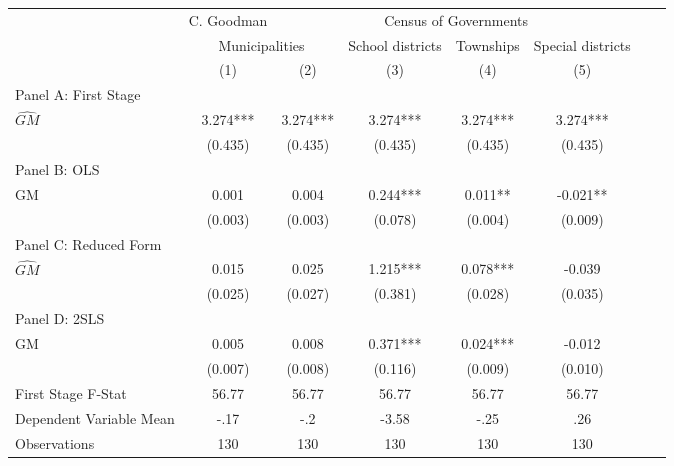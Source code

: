  \begin{tabular}{l*{7}{c}} \toprule
&\multicolumn{1}{c}{C. Goodman}&\multicolumn{4}{c}{Census of Governments}\\\cmidrule(lr){2-2}\cmidrule(lr){3-6}
&\multicolumn{2}{c}{Municipalities}&\multicolumn{1}{c}{School districts}&\multicolumn{1}{c}{Townships}&\multicolumn{1}{c}{Special districts}\\\cmidrule(lr){2-3}\cmidrule(lr){4-6}
&\multicolumn{1}{c}{(1)}&\multicolumn{1}{c}{(2)}&\multicolumn{1}{c}{(3)}&\multicolumn{1}{c}{(4)}&\multicolumn{1}{c}{(5)}\\
\cmidrule(lr){1-6}
\multicolumn{5}{l}{Panel A: First Stage}\\
\cmidrule(lr){1-6}
$\widehat{GM}$  &    3.274***&    3.274***&    3.274***&    3.274***&    3.274***\\
                &  (0.435)   &  (0.435)   &  (0.435)   &  (0.435)   &  (0.435)   \\
\cmidrule(lr){1-6}
\multicolumn{5}{l}{Panel B: OLS}\\
\cmidrule(lr){1-6}
GM              &    0.001   &    0.004   &    0.244***&    0.011** &   -0.021** \\
                &  (0.003)   &  (0.003)   &  (0.078)   &  (0.004)   &  (0.009)   \\
\cmidrule(lr){1-6}
\multicolumn{5}{l}{Panel C: Reduced Form}\\
\cmidrule(lr){1-6}
$\widehat{GM}$  &    0.015   &    0.025   &    1.215***&    0.078***&   -0.039   \\
                &  (0.025)   &  (0.027)   &  (0.381)   &  (0.028)   &  (0.035)   \\
\cmidrule(lr){1-6}
\multicolumn{5}{l}{Panel D: 2SLS}\\
\cmidrule(lr){1-6}
GM              &    0.005   &    0.008   &    0.371***&    0.024***&   -0.012   \\
                &  (0.007)   &  (0.008)   &  (0.116)   &  (0.009)   &  (0.010)   \\
\midrule
First Stage F-Stat&    56.77   &    56.77   &    56.77   &    56.77   &    56.77   \\
Dependent Variable Mean&     -.17   &      -.2   &    -3.58   &     -.25   &      .26   \\
Observations    &      130   &      130   &      130   &      130   &      130   \\
 \bottomrule \end{tabular}
